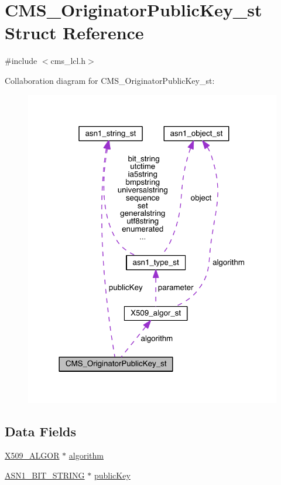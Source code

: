 \hypertarget{struct_c_m_s___originator_public_key__st}{}\section{C\+M\+S\+\_\+\+Originator\+Public\+Key\+\_\+st Struct Reference}
\label{struct_c_m_s___originator_public_key__st}


{\ttfamily \#include $<$cms\+\_\+lcl.\+h$>$}



Collaboration diagram for C\+M\+S\+\_\+\+Originator\+Public\+Key\+\_\+st\+:\nopagebreak
\begin{figure}[H]
\begin{center}
\leavevmode
\includegraphics[width=318pt]{struct_c_m_s___originator_public_key__st__coll__graph}
\end{center}
\end{figure}
\subsection*{Data Fields}
\begin{DoxyCompactItemize}
\item 
\hyperlink{crypto_2ossl__typ_8h_aa2b6185e6254f36f709cd6577fb5022e}{X509\+\_\+\+A\+L\+G\+OR} $\ast$ \hyperlink{struct_c_m_s___originator_public_key__st_a55bde876b7933b9536bdb80b6ca71fa1}{algorithm}
\item 
\hyperlink{crypto_2ossl__typ_8h_af837aaa00e151b1e8773aea5a8fe1cc4}{A\+S\+N1\+\_\+\+B\+I\+T\+\_\+\+S\+T\+R\+I\+NG} $\ast$ \hyperlink{struct_c_m_s___originator_public_key__st_abaa4257ba85b0782a4cafd428c054c13}{public\+Key}
\end{DoxyCompactItemize}


